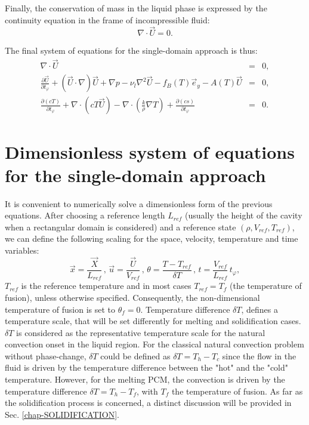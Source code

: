 Finally, the conservation of mass in the liquid phase is expressed by the continuity equation in the frame of incompressible fluid:
\begin{equation}\label{eq-mass-conserv}
\nabla \cdot \vec{U} = 0.
\end{equation} 

The final system of equations for the single-domain approach is thus:
\begin{eqnarray} 
	\nabla \cdot \vec{U} &=& 0, \\
	\frac{\partial \vec{U}}{\partial t_{\varphi}} +   {(\vec{U}\cdot\nabla ) \vec{U}} + \nabla p - \nu_{l}  {\nabla^2 \vec{U}} 
- f_B(T) \vec{e}_y - A(T) \vec{U} & = & 0, \\
	\frac{\partial \left(c T\right)}{\partial t_{\varphi}} + \nabla \cdot\left( c T \vec{U}\right) -
\nabla \cdot\left( \frac{k}{\rho} \nabla T \right) +  \frac{\partial \left(c s\right)}{\partial t_{\varphi}}  &=& 0.
\end{eqnarray}


\section{Dimensionless system of equations for the single-domain approach}\label{sec-eq-scaling}

It is convenient to numerically solve a dimensionless form of the previous equations.
After choosing a reference length $L_{ref}$ (usually the height of the cavity when a rectangular domain is considered) and a reference state $(\rho, V_{ref}, T_{ref})$, we can define the following scaling for the space, velocity, temperature and time variables:
\begin{equation}\label{eq-adim}
\vec{x} = \frac{\vec{X}}{L_{ref}} \, , \,  \vec{u} = \frac{\vec{U}}{V_{ref}} \, , \,  \theta = \frac{T-T_{ref}}{\delta T} \, , \,  t = \frac{V_{ref}}{L_{ref}} \, t_{\varphi},
\end{equation}
$T_{ref}$ is the reference temperature and in most cases $T_{ref} = T_f$ (the temperature of fusion), unless otherwise specified.
Consequently, the non-dimensional temperature of fusion is set to $\theta_f = 0$.
Temperature difference  $\delta T$, defines a temperature scale, that will be set differently for melting and solidification cases.
$\delta T$ is considered as the representative temperature scale  for the natural convection onset in the liquid region. 
For the classical natural convection problem without phase-change, $\delta T$ could be defined as $\delta T=T_{h}-T_{c}$ since the flow in the fluid is driven by the temperature difference between the "hot" and the "cold" temperature.
However, for the melting PCM, the convection is driven by the temperature difference $\delta T=T_{h}-T_{f}$, with $T_f$ the temperature of fusion.
As far as the solidification process is concerned, a distinct discussion will be provided in Sec. \ref{chap-SOLIDIFICATION}. %

